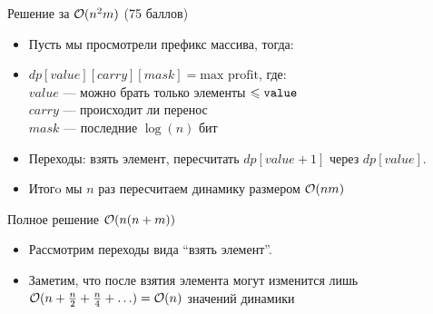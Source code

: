 \begin{frame}{Решение за $\mathcal{O}(n^2m)$ (75 баллов)}
  \begin{itemize}
  \item Пусть мы просмотрели префикс массива, тогда:
  \item $dp[value][carry][mask] = \text{max profit}$, где:\\
  \indent $value$ --- можно брать только элементы $\leqslant \texttt{value}$ \\
  \indent $carry$ --- происходит ли перенос \\
  \indent $mask$ --- последние $\log(n)$ бит \\
  \item Переходы: взять элемент, пересчитать $dp[value + 1]$ через $dp[value]$.
  \item Итогo мы $n$ раз пересчитаем динамику размером $\mathcal{O}(nm)$
  \end{itemize}
\end{frame}

\begin{frame}{Полное решение $\mathcal{O}(n(n + m))$}
  \begin{itemize}
  \item Рассмотрим переходы вида ``взять элемент''. 
  \item Заметим, что после взятия элемента могут изменится лишь $\mathcal{O}(n + \frac{n}{2} + \frac{n}{4} + \ldots) = \mathcal{O}(n)$ значений динамики
  \end{itemize}
\end{frame}

